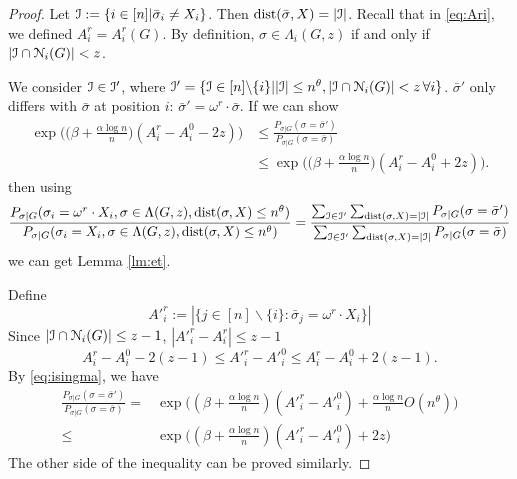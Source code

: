 \documentclass{article}
\begin{document}
\begin{proof}
	Let $\mathcal{I}: = \{i\in [n] | \bar{\sigma}_i \neq X_i\}$. Then $\operatorname{dist}(\bar{\sigma}, X) = |\mathcal{I}|$.
	Recall that in \eqref{eq:Ari}, we defined $A^r_i=A^r_i(G)$.
	By definition, $\sigma \in  \Lambda_i(G,z)$ if and only if $|\mathcal{I}\cap \mathcal{N}_i(G)| < z$.
	
	We consider $\mathcal{I} \in \mathcal{I}'$, where $\mathcal{I}' = \{\mathcal{I} \in [n]\backslash\{i\} |
	 |\mathcal{I}|\le n^\theta, |\mathcal{I} \cap \mathcal{N}_i(G)| < z\, \forall i\}$.
	$\bar{\sigma}'$ only differs with $\bar{\sigma}$ at
	position $i$: $\bar{\sigma}' = \omega^r \cdot \bar{\sigma}$.
	If we can show
	\begin{equation} \label{eq:qk}
	\begin{aligned}
	\exp\Big(\big(\beta+\frac{\alpha\log n}{n} \big) (A^r_i-A^0_i - 2z) \Big) & \le 
	\frac{P_{\sigma|G}(\sigma= \bar{\sigma}') } { P_{\sigma|G}(\sigma= \bar{\sigma} ) } \\
	& \le \exp\Big(\big(\beta+\frac{\alpha\log n}{n} \big) (A^r_i-A^0_i + 2z) \Big) .
	\end{aligned}
	\end{equation}
	then using 
	$$
	\frac{P_{\sigma|G}(\sigma_i= \omega^r \cdot X_i, \sigma\in \Lambda(G,z) ,\operatorname{dist}(\sigma, X) \le n^{\theta} ) } 
	{ P_{\sigma|G}(\sigma_i=X_i, \sigma\in \Lambda(G,z) ,\operatorname{dist}(\sigma, X) \le n^{\theta} ) } 
	= \frac{\sum_{\mathcal{I}\in \mathcal{I}'}\sum_{\operatorname{dist}(\sigma, X)=|\mathcal{I}|} P_{\sigma|G}(\sigma= \bar{\sigma}'  ) }
	{\sum_{\mathcal{I}\in \mathcal{I}'}\sum_{\operatorname{dist}(\sigma, X)=|\mathcal{I}|} P_{\sigma|G}(\sigma = \bar{\sigma}) } 
	$$
	we can get Lemma \ref{lm:et}.
	
	Define
	$$
	A'^r_i := |\{ j \in [n]\backslash \{i\}:  \bar{\sigma}_j = \omega^r \cdot X_i \}|
	$$
	Since $|\mathcal{I}\cap \mathcal{N}_{i}(G)| \le z-1$, $|A'^r_i - A^r_i| \leq z-1$
	\begin{equation} \label{eq:oo}
	A^r_i-A^0_i-2(z-1) \le A'^r_i-A'^0_i\le A^r_i-A^0_i+2(z-1) .
	\end{equation}
	By \eqref{eq:isingma}, we have
	\begin{align*}
	\frac{P_{\sigma|G}(\sigma=  \bar{\sigma}' ) } { P_{\sigma|G}(\sigma= \bar{\sigma}) }
	= & \exp\Big((\beta+\frac{\alpha\log n }{n})(A'^r_i-A'^0_i)
	+\frac{\alpha\log n}{n}O(n^{\theta})
	\Big)
	\\
	\leq & \exp\Big((\beta+\frac{\alpha\log n }{n})(A'^r_i-A'^0_i)+2z \Big)
	\end{align*}
	The other side of the inequality can be proved similarly.
\end{proof}
\end{document}
